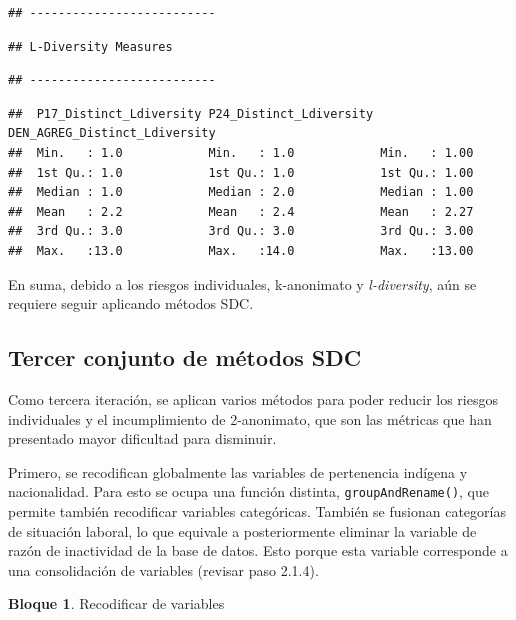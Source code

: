 \documentclass[]{book}
\theoremstyle{definition}
\theoremstyle{definition}
\newtheorem{example}{Bloque}[chapter]
\theoremstyle{definition}
\theoremstyle{definition}
\theoremstyle{remark}
\begin{document}
\begin{verbatim}
## --------------------------
\end{verbatim}

\begin{verbatim}
## L-Diversity Measures
\end{verbatim}

\begin{verbatim}
## --------------------------
\end{verbatim}

\begin{verbatim}
##  P17_Distinct_Ldiversity P24_Distinct_Ldiversity DEN_AGREG_Distinct_Ldiversity
##  Min.   : 1.0            Min.   : 1.0            Min.   : 1.00                
##  1st Qu.: 1.0            1st Qu.: 1.0            1st Qu.: 1.00                
##  Median : 1.0            Median : 2.0            Median : 1.00                
##  Mean   : 2.2            Mean   : 2.4            Mean   : 2.27                
##  3rd Qu.: 3.0            3rd Qu.: 3.0            3rd Qu.: 3.00                
##  Max.   :13.0            Max.   :14.0            Max.   :13.00
\end{verbatim}

En suma, debido a los riesgos individuales, k-anonimato y \emph{l-diversity}, aún se requiere seguir aplicando métodos SDC.

\hypertarget{tercer-conjunto-de-muxe9todos-sdc}{%
\subsection{Tercer conjunto de métodos SDC}\label{tercer-conjunto-de-muxe9todos-sdc}}

Como tercera iteración, se aplican varios métodos para poder reducir los riesgos individuales y el incumplimiento de 2-anonimato, que son las métricas que han presentado mayor dificultad para disminuir.

Primero, se recodifican globalmente las variables de pertenencia indígena y nacionalidad. Para esto se ocupa una función distinta, \texttt{groupAndRename()}, que permite también recodificar variables categóricas. También se fusionan categorías de situación laboral, lo que equivale a posteriormente eliminar la variable de razón de inactividad de la base de datos. Esto porque esta variable corresponde a una consolidación de variables (revisar paso 2.1.4).

\begin{example}
\protect\hypertarget{exm:bloque64nbm}{}{\label{exm:bloque64nbm} }Recodificar de variables
\end{example}
\end{document}
